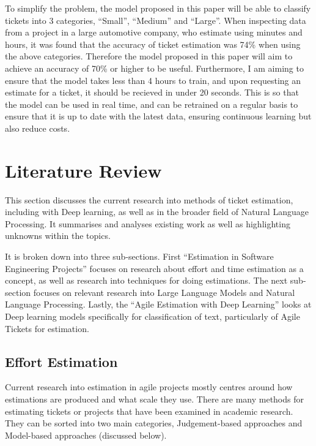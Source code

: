 \documentclass{UoYCSproject}
\begin{document}
    To simplify the problem, the model proposed in this paper will be able to classify tickets into 3 categories, “Small”, “Medium” and “Large”.
    When inspecting data from a project in a large automotive company, who estimate using minutes and hours, it was found that the accuracy of ticket estimation was 74\% when using the above categories.
    Therefore the model proposed in this paper will aim to achieve an accuracy of 70\% or higher to be useful.
    Furthermore, I am aiming to ensure that the model takes less than 4 hours to train, and upon requesting an estimate for a ticket, it should be recieved in under 20 seconds.
    This is so that the model can be used in real time, and can be retrained on a regular basis to ensure that it is up to date with the latest data, ensuring continuous learning but also reduce costs. \par


    \chapter{Literature Review}
    \label{ch:literature-review}
    This section discusses the current research into methods of ticket estimation, including with Deep learning, as well as in the broader field of Natural Language Processing.
    It summarises and analyses existing work as well as highlighting unknowns within the topics.

    It is broken down into three sub-sections.
    First “Estimation in Software Engineering Projects” focuses on research about effort and time estimation as a concept, as well as research into techniques for doing estimations.
    The next sub-section focuses on relevant research into Large Language Models and Natural Language Processing.
    Lastly, the “Agile Estimation with Deep Learning” looks at Deep learning models specifically for classification of text, particularly of Agile Tickets for estimation.


    \section{Effort Estimation}
    \label{sec:effort-estimation}
    Current research into estimation in agile projects mostly centres around how estimations are produced and what scale they use.
    There are many methods for estimating tickets or projects that have been examined in academic research.
    They can be sorted into two main categories, Judgement-based approaches and Model-based approaches (discussed below).
\end{document}
